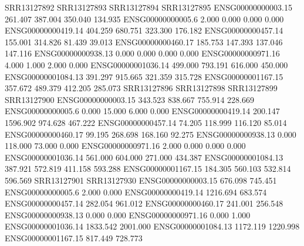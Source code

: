 \documentclass[
]{article}
\newenvironment{Shaded}{\begin{snugshade}}{\end{snugshade}}
\newcommand{\NormalTok}[1]{#1}
\begin{document}
\begin{Shaded}
\begin{Highlighting}[]
\NormalTok{                   SRR13127892 SRR13127893 SRR13127894 SRR13127895}
\NormalTok{ENSG00000000003.15     261.407     387.004     350.040     134.935}
\NormalTok{ENSG00000000005.6        2.000       0.000       0.000       0.000}
\NormalTok{ENSG00000000419.14     404.259     680.751     323.300     176.182}
\NormalTok{ENSG00000000457.14     155.001     314.826      81.439      39.013}
\NormalTok{ENSG00000000460.17     185.753     147.393     137.046     147.116}
\NormalTok{ENSG00000000938.13       0.000       0.000       0.000       0.000}
\NormalTok{ENSG00000000971.16       4.000       1.000       2.000       0.000}
\NormalTok{ENSG00000001036.14     499.000     793.191     616.000     450.000}
\NormalTok{ENSG00000001084.13     391.297     915.665     321.359     315.728}
\NormalTok{ENSG00000001167.15     357.672     489.379     412.205     285.073}
\NormalTok{                   SRR13127896 SRR13127898 SRR13127899 SRR13127900}
\NormalTok{ENSG00000000003.15     343.523     838.667     755.914     228.669}
\NormalTok{ENSG00000000005.6        0.000      15.000       6.000       0.000}
\NormalTok{ENSG00000000419.14     200.147    1596.902     974.628     467.222}
\NormalTok{ENSG00000000457.14      74.205     118.999     116.120      85.014}
\NormalTok{ENSG00000000460.17      99.195     268.698     168.160      92.275}
\NormalTok{ENSG00000000938.13       0.000     118.000      73.000       0.000}
\NormalTok{ENSG00000000971.16       2.000       0.000       0.000       0.000}
\NormalTok{ENSG00000001036.14     561.000     604.000     271.000     434.387}
\NormalTok{ENSG00000001084.13     387.921     572.819     411.158     593.288}
\NormalTok{ENSG00000001167.15     184.305     560.103     532.814     596.569}
\NormalTok{                   SRR13127901 SRR13127930}
\NormalTok{ENSG00000000003.15     676.098     745.451}
\NormalTok{ENSG00000000005.6        2.000       0.000}
\NormalTok{ENSG00000000419.14    1216.694     683.574}
\NormalTok{ENSG00000000457.14     282.054     961.012}
\NormalTok{ENSG00000000460.17     241.001     256.548}
\NormalTok{ENSG00000000938.13       0.000       0.000}
\NormalTok{ENSG00000000971.16       0.000       1.000}
\NormalTok{ENSG00000001036.14    1833.542    2001.000}
\NormalTok{ENSG00000001084.13    1172.119    1220.998}
\NormalTok{ENSG00000001167.15     817.449     728.773}
\end{Highlighting}
\end{Shaded}
\end{document}
